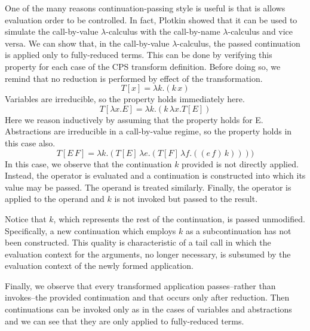\documentclass[ms,electronic,twosidetoc,letterpaper,chaptercenter,parttop]{byumsphd}
\begin{document}
One of the many reasons continuation-passing style is useful is that is allows evaluation
order to be controlled. In fact, Plotkin \cite{plotkin1975call} showed that it can be used
to simulate the call-by-value $\lambda$-calculus with the call-by-name $\lambda$-calculus
and vice versa. We can show that, in the call-by-value $\lambda$-calculus, the passed
continuation is applied only to fully-reduced terms. This can be done by verifying this
property for each case of the CPS transform definition. Before doing so, we remind that no
reduction is performed by effect of the transformation.
\[
T[x]=\lambda k.(k\,x)
\]
Variables are irreducible, so the property holds immediately here.
\[
T[\lambda x.E]=\lambda k.(k\,\lambda x.T[E])
\]
Here we reason inductively by assuming that the property holds for E. Abstractions are
irreducible in a call-by-value regime, so the property holds in this case also.
\[
T[E\,F]=\lambda k.(T[E]\,\lambda e.(T[F]\,\lambda f.((e\,f)\,k))))
\]
In this case, we observe that the continuation $k$ provided is not directly applied.
Instead, the operator is evaluated and a continuation is constructed into which its value
may be passed. The operand is treated similarly. Finally, the operator is applied to the
operand and $k$ is not invoked but passed to the result.

Notice that $k$, which represents the rest of the continuation, is passed unmodified.
Specifically, a new continuation which employs $k$ as a subcontinuation has not been
constructed. This quality is characteristic of a tail call in which the evaluation context
for the arguments, no longer necessary, is subsumed by the evaluation context of the newly
formed application.

Finally, we observe that every transformed application passes--rather than invokes--the
provided continuation and that occurs only after reduction. Then continuations can be
invoked only as in the cases of variables and abstractions and we can see that they are 
only applied to fully-reduced terms.




\end{document}
